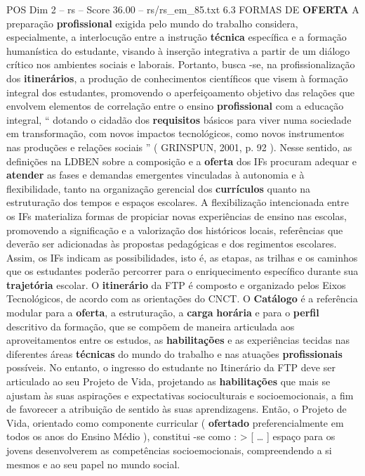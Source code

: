 \begin{textsample}{POS Dim 2 – rs – Score 36.00 – rs/rs\_em\_85.txt}  \label{ex:f2_pos_072}
6.3 FORMAS DE \textbf{OFERTA} A preparação \textbf{profissional} exigida pelo mundo do trabalho considera, especialmente, a interlocução entre a instrução \textbf{técnica} específica e a formação humanística do estudante, visando à inserção integrativa a partir de um diálogo crítico nos ambientes sociais e laborais.
Portanto, busca -se, na profissionalização dos \textbf{itinerários}, a produção de conhecimentos científicos que visem à formação integral dos estudantes, promovendo o aperfeiçoamento objetivo das relações que envolvem elementos de correlação entre o ensino \textbf{profissional} com a educação integral, “ dotando o cidadão dos \textbf{requisitos} básicos para viver numa sociedade em transformação, com novos impactos tecnológicos, como novos instrumentos nas produções e relações sociais ” ( GRINSPUN, 2001, p. 92 ).
Nesse sentido, as definições na LDBEN sobre a composição e a \textbf{oferta} dos IFs procuram adequar e \textbf{atender} as fases e demandas emergentes vinculadas à autonomia e à flexibilidade, tanto na organização gerencial dos \textbf{currículos} quanto na estruturação dos tempos e espaços escolares.
A flexibilização intencionada entre os IFs materializa formas de propiciar novas experiências de ensino nas escolas, promovendo a significação e a valorização dos históricos locais, referências que deverão ser adicionadas às propostas pedagógicas e dos regimentos escolares.
Assim, os IFs indicam as possibilidades, isto é, as etapas, as trilhas e os caminhos que os estudantes poderão percorrer para o enriquecimento específico durante sua \textbf{trajetória} escolar.
O \textbf{itinerário} da FTP é composto e organizado pelos Eixos Tecnológicos, de acordo com as orientações do CNCT.
O \textbf{Catálogo} é a referência modular para a \textbf{oferta}, a estruturação, a \textbf{carga} \textbf{horária} e para o \textbf{perfil} descritivo da formação, que se compõem de maneira articulada aos aproveitamentos entre os estudos, as \textbf{habilitações} e as experiências tecidas nas diferentes áreas \textbf{técnicas} do mundo do trabalho e nas atuações \textbf{profissionais} possíveis.
No entanto, o ingresso do estudante no Itinerário da FTP deve ser articulado ao seu Projeto de Vida, projetando as \textbf{habilitações} que mais se ajustam às suas aspirações e expectativas socioculturais e socioemocionais, a fim de favorecer a atribuição de sentido às suas aprendizagens.
Então, o Projeto de Vida, orientado como componente curricular ( \textbf{ofertado} preferencialmente em todos os anos do Ensino Médio ), constitui -se como : > [ … ] espaço para os jovens desenvolverem as competências socioemocionais, compreendendo a si mesmos e ao seu papel no mundo social.

\end{textsample}
